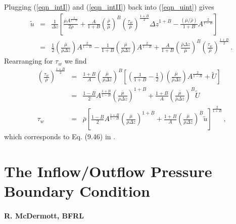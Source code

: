 \documentclass[11pt]{book}
\begin{document}
Plugging (\ref{eqn_intI}) and (\ref{eqn_intII}) back into (\ref{eqn_uint}) gives
\begin{eqnarray}
\label{eqn_combineint}
\tilde{u} &=& \frac{1}{\Delta z} \left[ \frac{\bar{\mu} A^{\frac{2}{1-B}}}{2\bar{\rho}} + \frac{A}{1+B} \left(\frac{\bar{\rho}}{\bar{\mu}}\right)^B \left(\frac{\tau_w}{\bar{\rho}}\right)^{\frac{1+B}{2}} {\Delta z}^{1+B} - \frac{(\bar{\mu}/\bar{\rho})}{1+B} A^{\frac{2}{1-B}} \right] \nonumber\\
&=& \frac{1}{2} \left(\frac{\bar{\mu}}{\bar{\rho}\Delta z}\right) A^{\frac{2}{1-B}} - \frac{1}{1+B} \left(\frac{\bar{\mu}}{\bar{\rho}\Delta z}\right) A^{\frac{2}{1-B}} + \frac{A}{1+B} \left(\frac{\bar{\rho}\Delta z}{\bar{\mu}}\right)^B \left(\frac{\tau_w}{\bar{\rho}}\right)^{\frac{1+B}{2}} \,\mbox{.}
\end{eqnarray}
Rearranging for $\tau_w$ we find
\begin{eqnarray}
\label{eqn_rearrangefortauw}
\left(\frac{\tau_w}{\bar{\rho}}\right)^{\frac{1+B}{2}} &=& \frac{1+B}{A}\left(\frac{\bar{\mu}}{\bar{\rho}\Delta z}\right)^B \left[ \left( \frac{1}{1+B} - \frac{1}{2}\right)\left(\frac{\bar{\mu}}{\bar{\rho}\Delta z}\right)A^{\frac{2}{1-B}} + \tilde{U} \right] \nonumber\\
&=& \frac{1-B}{2} A^{\frac{1+B}{1-B}} \left(\frac{\bar{\mu}}{\bar{\rho}\Delta z}\right)^{1+B}  + \frac{1+B}{A} \left(\frac{\bar{\mu}}{\bar{\rho}\Delta z }\right)^B \tilde{U} \nonumber\\
\tau_w &=& \bar{\rho} \left[ \frac{1-B}{2} A^{\frac{1+B}{1-B}} \left(\frac{\bar{\mu}}{\bar{\rho}\Delta z}\right)^{1+B}  + \frac{1+B}{A} \left(\frac{\bar{\mu}}{\bar{\rho}\Delta z }\right)^B \tilde{u} \right]^{\frac{2}{1+B}} \,\mbox{,}
\end{eqnarray}
which corresponds to Eq. (9.46) in \cite{Sagaut:2001}.


\chapter{The Inflow/Outflow Pressure Boundary Condition}
\subsubsection{R. McDermott, BFRL}
\label{app_pressbc}
\end{document}
